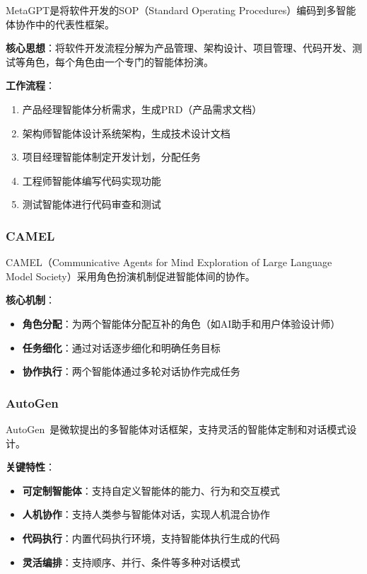 MetaGPT\cite{hong2024metagpt}是将软件开发的SOP（Standard Operating Procedures）编码到多智能体协作中的代表性框架。

\textbf{核心思想}：将软件开发流程分解为产品管理、架构设计、项目管理、代码开发、测试等角色，每个角色由一个专门的智能体扮演。

\textbf{工作流程}：
\begin{enumerate}[leftmargin=2em]
    \item 产品经理智能体分析需求，生成PRD（产品需求文档）
    \item 架构师智能体设计系统架构，生成技术设计文档
    \item 项目经理智能体制定开发计划，分配任务
    \item 工程师智能体编写代码实现功能
    \item 测试智能体进行代码审查和测试
\end{enumerate}

\subsubsection{CAMEL}

CAMEL（Communicative Agents for Mind Exploration of Large Language Model Society）\cite{li2023camel}采用角色扮演机制促进智能体间的协作。

\textbf{核心机制}：
\begin{itemize}[leftmargin=2em]
    \item \textbf{角色分配}：为两个智能体分配互补的角色（如AI助手和用户体验设计师）
    \item \textbf{任务细化}：通过对话逐步细化和明确任务目标
    \item \textbf{协作执行}：两个智能体通过多轮对话协作完成任务
\end{itemize}

\subsubsection{AutoGen}

AutoGen~\cite{wu2023autogen}是微软提出的多智能体对话框架，支持灵活的智能体定制和对话模式设计。

\textbf{关键特性}：
\begin{itemize}[leftmargin=2em]
    \item \textbf{可定制智能体}：支持自定义智能体的能力、行为和交互模式
    \item \textbf{人机协作}：支持人类参与智能体对话，实现人机混合协作
    \item \textbf{代码执行}：内置代码执行环境，支持智能体执行生成的代码
    \item \textbf{灵活编排}：支持顺序、并行、条件等多种对话模式
\end{itemize}

